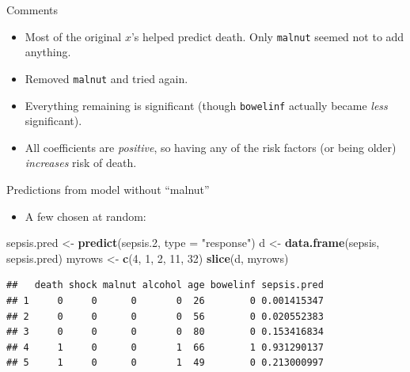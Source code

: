 \documentclass[ignorenonframetext,]{beamer}
\newenvironment{Shaded}{\begin{snugshade}}{\end{snugshade}}
\newcommand{\DataTypeTok}[1]{\textcolor[rgb]{0.13,0.29,0.53}{#1}}
\newcommand{\DecValTok}[1]{\textcolor[rgb]{0.00,0.00,0.81}{#1}}
\newcommand{\FloatTok}[1]{\textcolor[rgb]{0.00,0.00,0.81}{#1}}
\newcommand{\KeywordTok}[1]{\textcolor[rgb]{0.13,0.29,0.53}{\textbf{#1}}}
\newcommand{\NormalTok}[1]{#1}
\newcommand{\StringTok}[1]{\textcolor[rgb]{0.31,0.60,0.02}{#1}}
\providecommand{\tightlist}{%
  \setlength{\itemsep}{0pt}\setlength{\parskip}{0pt}}
\begin{document}
\begin{frame}[fragile]{Comments}
\protect\hypertarget{comments-11}{}

\begin{itemize}
\item
  Most of the original \(x\)'s helped predict death. Only
  \texttt{malnut} seemed not to add anything.
\item
  Removed \texttt{malnut} and tried again.
\item
  Everything remaining is significant (though \texttt{bowelinf} actually
  became \emph{less} significant).
\item
  All coefficients are \emph{positive}, so having any of the risk
  factors (or being older) \emph{increases} risk of death.
\end{itemize}

\end{frame}

\begin{frame}[fragile]{Predictions from model without ``malnut''}
\protect\hypertarget{predictions-from-model-without-malnut}{}

\begin{itemize}
\tightlist
\item
  A few chosen at random:
\end{itemize}

\normalsize

\begin{Shaded}
\begin{Highlighting}[]
\NormalTok{sepsis.pred <-}\StringTok{ }\KeywordTok{predict}\NormalTok{(sepsis}\FloatTok{.2}\NormalTok{, }\DataTypeTok{type =} \StringTok{"response"}\NormalTok{)}
\NormalTok{d <-}\StringTok{ }\KeywordTok{data.frame}\NormalTok{(sepsis, sepsis.pred)}
\NormalTok{myrows <-}\StringTok{ }\KeywordTok{c}\NormalTok{(}\DecValTok{4}\NormalTok{, }\DecValTok{1}\NormalTok{, }\DecValTok{2}\NormalTok{, }\DecValTok{11}\NormalTok{, }\DecValTok{32}\NormalTok{)}
\KeywordTok{slice}\NormalTok{(d, myrows)}
\end{Highlighting}
\end{Shaded}

\begin{verbatim}
##   death shock malnut alcohol age bowelinf sepsis.pred
## 1     0     0      0       0  26        0 0.001415347
## 2     0     0      0       0  56        0 0.020552383
## 3     0     0      0       0  80        0 0.153416834
## 4     1     0      0       1  66        1 0.931290137
## 5     1     0      0       1  49        0 0.213000997
\end{verbatim}

\normalsize

\end{frame}
\end{document}
